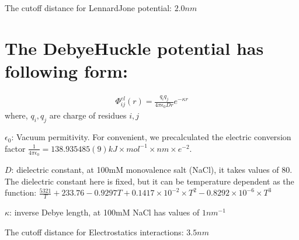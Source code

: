 \documentclass[letterpaper,10pt,english]{sphinxmanual}
\begin{document}
\sphinxAtStartPar
The cut\sphinxhyphen{}off distance for Lennard\sphinxhyphen{}Jone potential: \(2.0 nm\)


\section{The Debye\sphinxhyphen{}Huckle potential has following form:}
\label{\detokenize{modules/models:the-debye-huckle-potential-has-following-form}}\begin{equation*}
\begin{split}\Phi_{ij}^{el}(r) = \frac{q_{i}q_{j}}{4\pi\epsilon_0 D r}e^{-\kappa r}\end{split}
\end{equation*}
\sphinxAtStartPar
where, \(q_i, q_j\) are charge of residues \(i, j\)

\sphinxAtStartPar
\(\epsilon_0\): Vacuum permitivity. For convenient, we precalculated the electric conversion factor
\(\frac{1}{4\pi\epsilon_0}= 138.935 485(9) kJ \times mol^{−1} \times nm \times e^{−2}\).

\sphinxAtStartPar
\(D\): dielectric constant, at 100mM mono\sphinxhyphen{}valence salt (NaCl), it takes values of 80.
The dielectric constant here is fixed, but it can be temperature dependent as the function:
\(\frac{5321}{T}+233.76-0.9297T+0.1417\times 10^{-2}\times T^2 - 0.8292\times 10^{-6}\times T^3\)

\sphinxAtStartPar
\(\kappa\): inverse Debye length, at 100mM NaCl has values of \(1 nm^{-1}\)

\sphinxAtStartPar
The cut\sphinxhyphen{}off distance for Electrostatics interactions: \(3.5 nm\)
\end{document}

